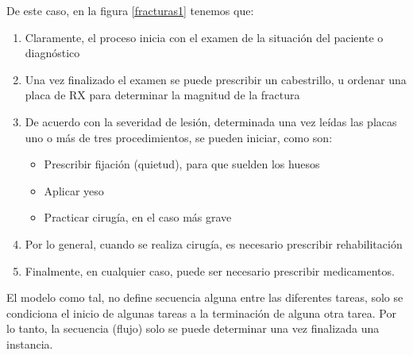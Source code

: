 De este caso, en la figura \ref{fracturas1} tenemos que:

\begin{enumerate}
    
\item Claramente, el proceso inicia con el examen de la situación del paciente o diagnóstico 

\item Una vez finalizado el examen se puede prescribir un cabestrillo, u ordenar una placa de RX para determinar la magnitud de la fractura

\item De acuerdo con la severidad de lesión, determinada una vez leídas las placas uno o más de tres procedimientos, se pueden iniciar, como son:

\begin{itemize}
    \item Prescribir fijación (quietud), para que suelden los huesos 
    \item Aplicar yeso
    \item Practicar cirugía, en el caso más grave
\end{itemize}

\item Por lo general, cuando se realiza cirugía, es necesario prescribir rehabilitación

\item Finalmente, en cualquier caso, puede ser necesario prescribir medicamentos.
\end{enumerate}

El modelo como tal, no define secuencia alguna entre las diferentes tareas, solo se condiciona el inicio de algunas tareas a la terminación de alguna otra tarea. Por lo tanto, la secuencia (flujo) solo se puede determinar una vez finalizada una instancia. 



